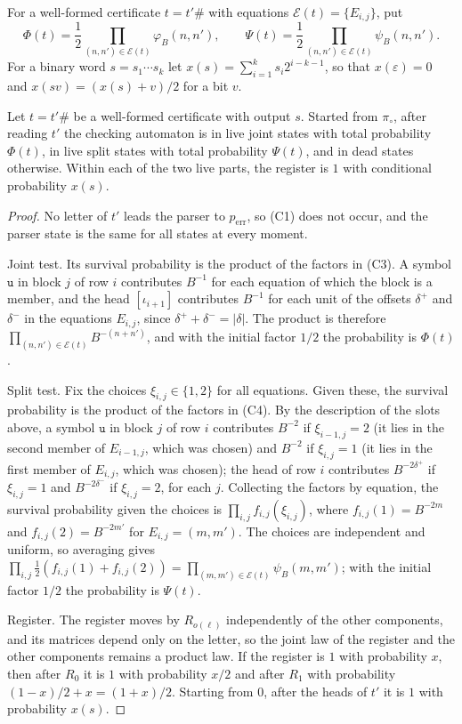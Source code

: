 \documentclass[11pt]{article}
\theoremstyle{plain}
\theoremstyle{definition}
\theoremstyle{remark}
\newcommand{\eps}{\varepsilon}
\newcommand{\un}{\mathtt{u}}
\newcommand{\perr}{p_{\mathrm{err}}}
\newcommand{\cE}{\mathcal E}
\begin{document}
For a well-formed certificate $t=t'\#$ with equations $\cE(t)=\{E_{i,j}\}$, put
\[
\Phi(t)=\frac12\prod_{(n,n')\in\cE(t)}\varphi_B(n,n'),\qquad \Psi(t)=\frac12\prod_{(n,n')\in\cE(t)}\psi_B(n,n').
\]
For a binary word $s=s_1\cdots s_k$ let $x(s)=\sum_{i=1}^ks_i2^{i-k-1}$, so that $x(\eps)=0$ and $x(sv)=(x(s)+v)/2$ for a bit $v$.

\begin{lemma}\label{lem:masses}
Let $t=t'\#$ be a well-formed certificate with output $s$. Started from $\pi_\circ$, after reading $t'$ the checking automaton is in live joint states with total probability $\Phi(t)$, in live split states with total probability $\Psi(t)$, and in dead states otherwise. Within each of the two live parts, the register is $1$ with conditional probability $x(s)$.
\end{lemma}

\begin{proof}
No letter of $t'$ leads the parser to $\perr$, so (C1) does not occur, and the parser state is the same for all states at every moment.

Joint test. Its survival probability is the product of the factors in (C3). A symbol $\un$ in block $j$ of row $i$ contributes $B^{-1}$ for each equation of which the block is a member, and the head $[\iota_{i+1}]$ contributes $B^{-1}$ for each unit of the offsets $\delta^+$ and $\delta^-$ in the equations $E_{i,j}$, since $\delta^++\delta^-=|\delta|$. The product is therefore $\prod_{(n,n')\in\cE(t)}B^{-(n+n')}$, and with the initial factor $1/2$ the probability is $\Phi(t)$.

Split test. Fix the choices $\xi_{i,j}\in\{1,2\}$ for all equations. Given these, the survival probability is the product of the factors in (C4). By the description of the slots above, a symbol $\un$ in block $j$ of row $i$ contributes $B^{-2}$ if $\xi_{i-1,j}=2$ (it lies in the second member of $E_{i-1,j}$, which was chosen) and $B^{-2}$ if $\xi_{i,j}=1$ (it lies in the first member of $E_{i,j}$, which was chosen); the head of row $i$ contributes $B^{-2\delta^+}$ if $\xi_{i,j}=1$ and $B^{-2\delta^-}$ if $\xi_{i,j}=2$, for each $j$. Collecting the factors by equation, the survival probability given the choices is $\prod_{i,j}f_{i,j}(\xi_{i,j})$, where $f_{i,j}(1)=B^{-2m}$ and $f_{i,j}(2)=B^{-2m'}$ for $E_{i,j}=(m,m')$. The choices are independent and uniform, so averaging gives $\prod_{i,j}\frac12(f_{i,j}(1)+f_{i,j}(2))=\prod_{(m,m')\in\cE(t)}\psi_B(m,m')$; with the initial factor $1/2$ the probability is $\Psi(t)$.

Register. The register moves by $R_{o(\ell)}$ independently of the other components, and its matrices depend only on the letter, so the joint law of the register and the other components remains a product law. If the register is $1$ with probability $x$, then after $R_0$ it is $1$ with probability $x/2$ and after $R_1$ with probability $(1-x)/2+x=(1+x)/2$. Starting from $0$, after the heads of $t'$ it is $1$ with probability $x(s)$.
\end{proof}
\end{document}
